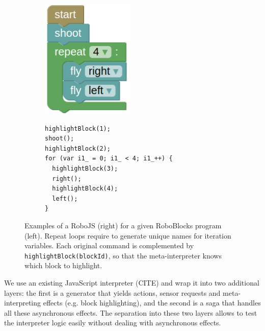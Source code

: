 

\begin{figure}[h]
\begin{subfigure}{.28\textwidth}
\centering\includegraphics[width=.8\textwidth]{img/roboblocks-english}
\end{subfigure}
\begin{subfigure}{.7\textwidth}
{\lstset{numbers=none}
\begin{lstlisting}
highlightBlock(1);
shoot();
highlightBlock(2);
for (var i1_ = 0; i1_ < 4; i1_++) {
  highlightBlock(3);
  right();
  highlightBlock(4);
  left();
}
\end{lstlisting}}
\end{subfigure}
\caption{%
  Examples of a RoboJS (right) for a given RoboBlocks program (left). %
  Repeat loops require to generate unique names for iteration variables.
  Each original command is complemented by \texttt{highlightBlock(blockId)},
  so that the meta-interpreter knows which block to highlight.}
\label{fig:robojs-example}
\end{figure}


We use an existing JavaScript interpreter (CITE) and wrap it into two
additional layers: the first is a generator
that yields actions, sensor requests and
meta-interpreting effects (e.g. block highlighting), %
and the second is a saga
that handles all these asynchronous effects.
The separation into these two layers allows to test the interpreter logic
easily without dealing with asynchronous effects.
